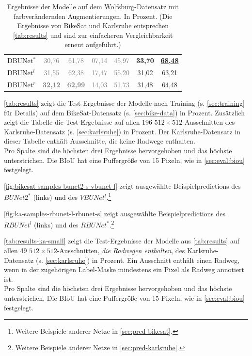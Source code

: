 \begin{table}[ht]
\begin{tabular}{l|cc|cc|cc}
        DBUNet$^*$ & \textcolor{gray}{30,76} & \textcolor{gray}{61,78} & \textcolor{gray}{07,14} & \textcolor{gray}{45,97} &  \textbf{33,70} & \underline{\textbf{68,48}} \\
        DBUNet$^l$ & \textcolor{gray}{31,55} & \textcolor{gray}{62,38} & \textcolor{gray}{17,47} & \textcolor{gray}{55,20} &  31,02 & 63,21 \\
        DBUNet$^r$ & \textcolor{gray}{\textbf{32,12}} & \textcolor{gray}{\textbf{62,99}} & \textcolor{gray}{14,03} & \textcolor{gray}{51,73} &  31,48 & 64,48 \\
        
	\end{tabular}
	\caption{Ergebnisse der Modelle auf dem Wolfsburg-Datensatz mit farbverändernden Augmentierungen. In Prozent.
	(Die Ergebnisse von BikeSat und Karlsruhe entsprechen \autoref{tab:results} und sind zur einfacheren Vergleichbarkeit erneut aufgeführt.)}
	\label{tab:results-wolfsburg}
\end{table}

\autoref{tab:results} zeigt die Test-Ergebnisse der Modelle nach Training (s. \autoref{sec:training} für Details) auf dem BikeSat-Datensatz 
(s. \autoref{sec:bike-data}) in Prozent. Zusätzlich zeigt die Tabelle die Test-Ergebnisse auf allen 196 $512{\times}512$-Ausschnitten 
des Karlsruhe-Datensatz (s. \autoref{sec:karlsruhe}) in Prozent. Der Karlsruhe-Datensatz in dieser Tabelle
enthält Ausschnitte, die keine Radwege enthalten. \\ 
Pro Spalte sind die höchsten drei Ergebnisse hervorgehoben und das höchste unterstrichen.
Die \ac{BIoU} hat eine Puffergröße von 15 Pixeln, wie in \autoref{sec:eval:biou} festgelegt.

\autoref{fig:bikesat-samples-bunet2-s-vbunet-l} zeigt ausgewählte Beispielpredictions des $BUNet2^*$ (links) und 
des $VBUNet^l$.\footnote{Weitere Beispiele anderer Netze in \autoref{sec:pred-bikesat}.}

\autoref{fig:ka-samples-rbunet-l-rbunet-s} zeigt ausgewählte Beispielpredictions des $RBUNet^l$ (links) und 
des $RBUNet^*$.\footnote{Weitere Beispiele anderer Netze in \autoref{sec:pred-karlsruhe}.}

\autoref{tab:results-ka-small} zeigt die Test-Ergebnisse der Modelle aus \autoref{tab:results} auf allen 49 $512{\times}512$-Ausschnitten, 
\textit{die Radwegen enthalten}, des Karlsruhe-Datensatz (s. \autoref{sec:karlsruhe}) in Prozent. 
Ein Ausschnitt enthält einen Radweg, wenn in der zugehörigen Label-Maske mindestens ein Pixel als Radweg annotiert ist. \\
Pro Spalte sind die höchsten drei Ergebnisse hervorgehoben und das höchste unterstrichen.
Die \ac{BIoU} hat eine Puffergröße von 15 Pixeln, wie in \autoref{sec:eval:biou} festgelegt.

